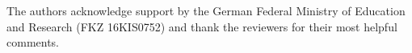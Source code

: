 \documentclass[sigchi, nonacm=true]{acmart}
\begin{document}
\begin{acks}
  The authors acknowledge support by the German Federal Ministry of Education and Research (FKZ 16KIS0752) and thank the reviewers for their most helpful comments.
\end{acks}




\appendix
\end{document}
